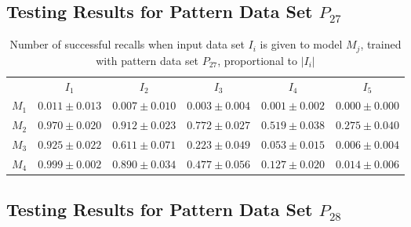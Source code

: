 \documentclass[anon]{CI}
\begin{document}
		\subsection{Testing Results for Pattern Data Set $P_{27}$}
		
		
		\begin{table}[H]
			\centering
			\def\arraystretch{1.5}
			\footnotesize
			\begin{tabular}{cccccc}
				
				& $I_{1}$  & $I_{2}$  & $I_{3}$  & $I_{4}$  & $I_{5}$ \\ \cline{2-6}
				$M_{1}$  & $0.011\pm0.013$  & $0.007\pm0.010$  & $0.003\pm0.004$  & $0.001\pm0.002$  & $0.000\pm0.000$ \\
				$M_{2}$  & $0.970\pm0.020$  & $0.912\pm0.023$  & $0.772\pm0.027$  & $0.519\pm0.038$  & $0.275\pm0.040$ \\
				$M_{3}$  & $0.925\pm0.022$  & $0.611\pm0.071$  & $0.223\pm0.049$  & $0.053\pm0.015$  & $0.006\pm0.004$ \\
				$M_{4}$  & $0.999\pm0.002$  & $0.890\pm0.034$  & $0.477\pm0.056$  & $0.127\pm0.020$  & $0.014\pm0.006$ \\
				
			\end{tabular}
			\caption{Number of successful recalls when input data set $I_i$ is given to model $M_j$, trained with pattern data set $P_{27}$, proportional to $\left|I_i\right|$}
		\end{table}
		
		\subsection{Testing Results for Pattern Data Set $P_{28}$}
		
		
\end{document}
